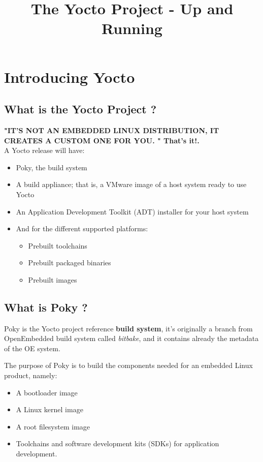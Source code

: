 \documentclass{article}
\title{\textbf{The Yocto Project - Up and Running}}
\author{}
\date{}
\begin{document}
\maketitle
\tableofcontents{}
\section{Introducing Yocto}
\subsection{What is the Yocto Project ?}
\textbf{"IT'S NOT AN EMBEDDED LINUX DISTRIBUTION, IT CREATES A CUSTOM ONE FOR YOU. " That's it!.} \\

A Yocto release will have:
\begin{itemize}
    \item Poky, the build system
    \item A build appliance; that is, a VMware image of a host system ready to use Yocto
    \item An Application Development Toolkit (ADT) installer for your host system
    \item And for the different supported platforms:
\begin{itemize}
    \item Prebuilt toolchains
    \item Prebuilt packaged binaries
    \item Prebuilt images
\end{itemize}
\end{itemize}

\subsection{What is Poky ?}
Poky is the Yocto project reference \textbf{build system}, it's originally a branch from OpenEmbedded build system called \textit{bitbake}, and it contains already the metadata of the OE system.

The purpose of Poky is to build the components needed for an embedded Linux product, namely:
\begin{itemize}
    \item A bootloader image
    \item A Linux kernel image
    \item A root filesystem image
    \item Toolchains and software development kits (SDKs) for application development.
\end{itemize}
\end{document}
